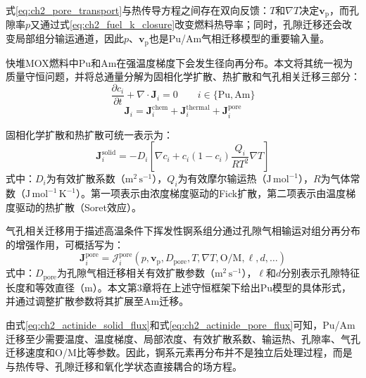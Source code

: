 式\eqref{eq:ch2_pore_transport}与热传导方程之间存在双向反馈：$T$和$\nabla T$决定$\mathbf v_{\mathrm p}$，而孔隙率$p$又通过式\eqref{eq:ch2_fuel_k_closure}改变燃料热导率；同时，孔隙迁移还会改变局部组分输运通道，因此$p$、$\mathbf v_{\mathrm p}$也是Pu/Am气相迁移模型的重要输入量。

\label{subsec:ch2_actinide_transport}

快堆MOX燃料中Pu和Am在强温度梯度下会发生径向再分布。本文将其统一视为质量守恒问题，并将总通量分解为固相化学扩散、热扩散和气孔相关迁移三部分：
\begin{equation}
	\frac{\partial c_i}{\partial t}
	+\nabla\cdot\mathbf J_i=0
	\qquad
	i\in\{\mathrm{Pu},\mathrm{Am}\}
	\label{eq:ch2_actinide_conservation}
\end{equation}
\begin{equation}
	\mathbf J_i
	=\mathbf J_i^{\mathrm{chem}}
	+\mathbf J_i^{\mathrm{thermal}}
	+\mathbf J_i^{\mathrm{pore}}
	\label{eq:ch2_actinide_flux_decomposition}
\end{equation}

固相化学扩散和热扩散可统一表示为：
\begin{equation}
	\mathbf J_i^{\mathrm{solid}}
	=-D_i
	\left[
		\nabla c_i
		+c_i(1-c_i)
		\frac{Q_i}{RT^2}\nabla T
		\right]
	\label{eq:ch2_actinide_solid_flux}
\end{equation}
\noindent 式中：$D_i$为有效扩散系数（$\mathrm{m^2\,s^{-1}}$），$Q_i$为有效摩尔输运热（$\mathrm{J\,mol^{-1}}$），$R$为气体常数（$\mathrm{J\,mol^{-1}\,K^{-1}}$）。第一项表示由浓度梯度驱动的Fick扩散，第二项表示由温度梯度驱动的热扩散（Soret效应）。

气孔相关迁移用于描述高温条件下挥发性锕系组分通过孔隙气相输运对组分再分布的增强作用，可概括写为：
\begin{equation}
	\mathbf J_i^{\mathrm{pore}}
	=\mathcal J_i^{\mathrm{pore}}
	\left(
	p,\mathbf v_{\mathrm p},D_{\mathrm{pore}},T,\nabla T,\mathrm{O/M},\ell,d,\ldots
	\right)
	\label{eq:ch2_actinide_pore_flux}
\end{equation}
\noindent 式中：$D_{\mathrm{pore}}$为孔隙气相迁移相关有效扩散参数（$\mathrm{m^2\,s^{-1}}$），$\ell$和$d$分别表示孔隙特征长度和等效直径（$\mathrm{m}$）。本文第3章将在上述守恒框架下给出Pu模型的具体形式，并通过调整扩散参数将其扩展至Am迁移。

由式\eqref{eq:ch2_actinide_solid_flux}和式\eqref{eq:ch2_actinide_pore_flux}可知，Pu/Am迁移至少需要温度、温度梯度、局部浓度、有效扩散系数、输运热、孔隙率、气孔迁移速度和O/M比等参数。因此，锕系元素再分布并不是独立后处理过程，而是与热传导、孔隙迁移和氧化学状态直接耦合的场方程。

